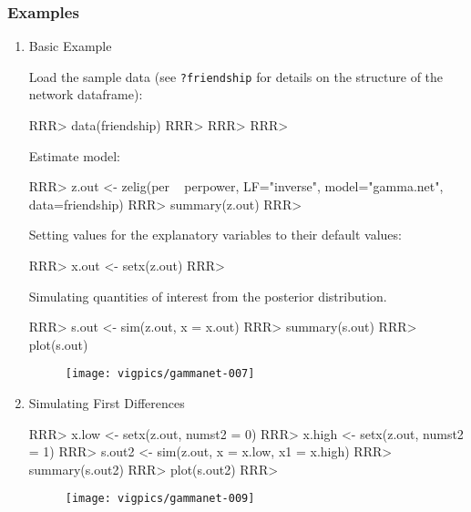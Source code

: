 \subsubsection{Examples} 
\begin{enumerate} 
\item Basic Example 
 
Load the sample data (see {\tt ?friendship} for details on the structure of the network dataframe): 
 
\begin{Schunk}
\begin{Sinput}
RRR> data(friendship) 
RRR>  
RRR>  
RRR>  
\end{Sinput}
\end{Schunk}
Estimate model: 
 
\begin{Schunk}
\begin{Sinput}
RRR> z.out <- zelig(per ~ perpower, LF="inverse",  model="gamma.net", data=friendship) 
RRR> summary(z.out) 
RRR>  
\end{Sinput}
\end{Schunk}
Setting values for the explanatory variables to their default values: 
 
\begin{Schunk}
\begin{Sinput}
RRR> x.out <- setx(z.out) 
RRR>  
\end{Sinput}
\end{Schunk}
Simulating quantities of interest from the posterior distribution. 
\begin{Schunk}
\begin{Sinput}
RRR> s.out <- sim(z.out, x = x.out)  
RRR> summary(s.out)  
RRR> plot(s.out)  
\end{Sinput}
\end{Schunk}
 
\begin{figure}[here] 
\centering 
\texttt{[image: vigpics/gammanet-007]}
\label{fig:plotgam} 
\end{figure} 
 
 
\item Simulating First Differences 
 
\begin{Schunk}
\begin{Sinput}
RRR> x.low <- setx(z.out, numst2 = 0) 
RRR> x.high <- setx(z.out, numst2 = 1) 
RRR> s.out2 <- sim(z.out, x = x.low, x1 = x.high)    
RRR> summary(s.out2)    
RRR> plot(s.out2)    
RRR>  
\end{Sinput}
\end{Schunk}
 
\begin{figure}[here] 
\centering 
\texttt{[image: vigpics/gammanet-009]}
\label{fig:plotgam} 
\end{figure} 
 
\end{enumerate} 
 
